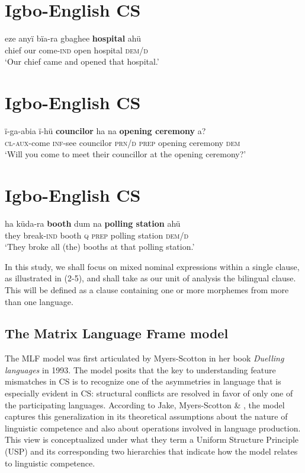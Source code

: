 \documentclass[output=paper]{langsci/langscibook}
\begin{document}
\chapter[Igbo{}-English CS]{Igbo-English \textsc{CS}}
\gll   eze  anyï  bïa-ra        gbaghee  \textbf{hospital  }ahü \textbf{ }\\
       chief   our  come-\textsc{ind}  open        hospital  \textsc{dem/d}\\
\glt   ‘Our chief came and opened that hospital.’
\z

\chapter[Igbo{}-English CS]{Igbo-English \textsc{CS}}
\gll   ï-ga-abia  ï-hü  \textbf{councilor  }ha  na  \textbf{opening ceremony }a?\\
     \textsc{  cl-aux}{}-come  \textsc{inf}{}-see  councilor  \textsc{prn/d}  \textsc{prep}  opening ceremony \textsc{dem}\\
\glt   ‘Will you come to meet their councillor at the opening ceremony?’
\z

\chapter[Igbo{}-English CS]{Igbo-English \textsc{CS}}
\gll ha    küda-ra     \textbf{booth }dum   na    \textbf{polling station }ahü\\
     they break-\textsc{ind}  booth  \textsc{q}  \textsc{prep}  polling station   \textsc{dem/d}\\
\glt ‘They broke all (the) booths at that polling station.’ \textsubscript{ } 
\z

In this study, we shall focus on mixed nominal expressions within a single clause, as illustrated in (2-5), and shall take as our unit of analysis the bilingual clause. This will be defined as a clause containing one or more morphemes from more than one language.

\section{ The Matrix Language Frame model}

The MLF model was first articulated by Myers-Scotton in her book \textit{Duelling languages }in 1993. The model posits that the key to understanding feature mismatches in CS is to recognize one of the asymmetries in language that is especially evident in CS: structural conflicts are resolved in favor of only one of the participating languages. According to Jake, Myers-Scotton \& \citet[72]{Gross2002}, the model captures this generalization in its theoretical assumptions about the nature of linguistic competence and also about operations involved in language production. This view is conceptualized under what they term a Uniform Structure Principle (USP) and its corresponding two hierarchies that indicate how the model relates to linguistic competence. 
\end{document}
